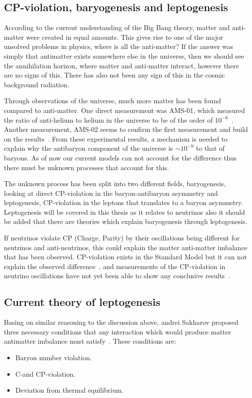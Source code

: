 \subsection{CP-violation, baryogenesis and leptogenesis}
According to the current understanding of the Big Bang theory, matter and anti-matter were created in equal amounts\cite{14Berry}. This gives rise to one of the major unsolved problems in physics, where is all the anti-matter? If the answer was simply that antimatter exists somewhere else in the universe, then we should see the annihilation horizon, where matter and anti-matter interact, however there are no signs of this. There has also not been any sign of this in the cosmic background radiation\cite{14Berry}.

Through observations of the universe, much more matter has been found compared to anti-matter. One direct measurement was AMS-01, which measured the ratio of anti-helium to helium in the universe to be of the order of $10^{-6}$~\cite{15AMS1}. Another measurement, AMS-02 seems to confirm the first measurement and build on the results~\cite{16AMS2}. 
From these experimental results, a mechanism is needed to explain why the antibaryon component of the universe is $\sim 10^{-9}$ to that of baryons. As of now our current models can not account for the difference thus there must be unknown processes that account for this.

The unknown process has been split into two different fields, baryogenesis, looking at direct CP-violation in the baryon-antibaryon asymmetry and leptogenesis, CP-violation in the leptons that translates to a baryon asymmetry. Leptogenesis will be covered in this thesis as it relates to neutrinos also it should be added that there are theories which explain baryogenesis through leptogenesis.

If neutrinos violate CP (Charge, Parity) by their oscillations being different for neutrinos and anti-neutrinos, this could explain the matter anti-matter imbalance that has been observed. CP-violation exists in the Standard Model but it can not explain the observed difference~\cite{3Peskin}, and measurements of the CP-violation in neutrino oscillations have not yet been able to show any conclusive results~\cite{17Gonzalez}.

\subsection{Current theory of leptogenesis}
Basing on similar reasoning to the discussion above, andrei Sakharov proposed three necessary conditions that any interaction which would produce matter antimatter imbalance must satisfy~\cite{37Sakharov}. These conditions are:
\begin{itemize}
\item Baryon number violation.
\item C-and CP-violation.
\item Deviation from thermal equilibrium.
\end{itemize}

